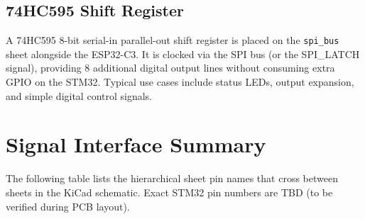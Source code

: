 \documentclass[11pt,a4paper]{article}
\begin{document}
\subsection{74HC595 Shift Register}

A 74HC595 8-bit serial-in parallel-out shift register is placed on the \texttt{spi\_bus} sheet alongside the ESP32-C3. It is clocked via the SPI bus (or the SPI\_LATCH signal), providing 8 additional digital output lines without consuming extra GPIO on the STM32. Typical use cases include status LEDs, output expansion, and simple digital control signals.

\section{Signal Interface Summary}

The following table lists the hierarchical sheet pin names that cross between sheets in the KiCad schematic. Exact STM32 pin numbers are TBD (to be verified during PCB layout).
\end{document}
